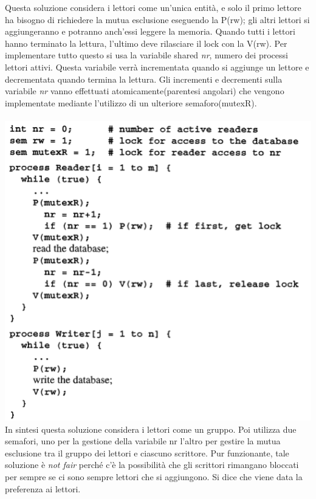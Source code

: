 \documentclass[10pt,a4paper]{book}
\begin{document}
Questa soluzione considera i lettori come un'unica entità, e solo il primo lettore ha bisogno di richiedere la mutua esclusione eseguendo la P(rw); gli altri lettori si aggiungeranno e potranno anch'essi leggere la memoria.
Quando tutti i lettori hanno terminato la lettura, l'ultimo deve rilasciare il lock con la V(rw).
Per implementare tutto questo si usa la variabile shared \textit{nr}, numero dei processi lettori attivi. Questa variabile verrà incrementata quando si aggiunge un lettore e decrementata quando termina la lettura.  Gli incrementi e decrementi sulla variabile \textit{nr} vanno effettuati atomicamente(parentesi angolari) che vengono implementate mediante l'utilizzo di un ulteriore semaforo(mutexR).\\ \\
\includegraphics[scale=0.41]{img/over3.png} \\
In sintesi questa soluzione considera i lettori come un gruppo. Poi utilizza due semafori, uno per la gestione della variabile nr l'altro per gestire la mutua esclusione tra il gruppo dei lettori e ciascuno scrittore.
Pur funzionante, tale soluzione è \textit{not fair} perché c'è la possibilità che gli scrittori rimangano bloccati per sempre se ci sono sempre lettori che si aggiungono. Si dice che viene data la preferenza ai lettori.
\end{document}
